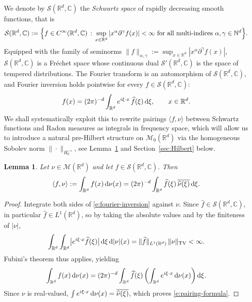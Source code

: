 \documentclass[12pt,a4paper,oneside]{amsart}
\theoremstyle{plain}
\newtheorem{lemma}[theorem]{Lemma}
\theoremstyle{definition}
\numberwithin{equation}{section}
\numberwithin{figure}{section}
\numberwithin{table}{section}
\theoremstyle{remark}
\newcommand{\R}{\mathbb{R}}
\newcommand{\dd}{\textup{d}}
\newcommand{\calM}{\mathcal{M}}
\newcommand{\N}{\mathbb{N}}
\newcommand{\Fhat}[1]{\widehat{#1}}
\begin{document}
We denote by $\mathcal{S}(\R^d,\mathbb{C})$ the \emph{Schwartz space} of
rapidly decreasing smooth functions, that is
\begin{equation*}
    \mathcal{S}(\R^d,\mathbb{C}) := \Bigl\{ f \in C^\infty(\R^d,\mathbb{C})
    \,:\, \sup_{x\in\R^d} |x^\alpha \partial^\gamma f(x)| < \infty
    \text{ for all multi-indices } \alpha, \gamma \in \N^d \Bigr\}.
\end{equation*}
Equipped with the family of seminorms $\|f\|_{\alpha,\gamma} :=
\sup_{x\in\R^d} |x^\alpha \partial^\gamma f(x)|$,
$\mathcal{S}(\R^d,\mathbb{C})$ is a Fr\'echet space whose continuous dual
$\mathcal{S}'(\R^d,\mathbb{C})$ is the space of tempered distributions.
The Fourier transform is an automorphism of $\mathcal{S}(\R^d,\mathbb{C})$,
and Fourier inversion holds pointwise for every
$f \in \mathcal{S}(\R^d,\mathbb{C})$:
\begin{equation}\label{e:fourier-inversion}
    f(x) = (2\pi)^{-d}\int_{\R^d} e^{i\xi \cdot x}\, \Fhat{f}(\xi)\,\dd\xi,
    \qquad x \in \R^d.
\end{equation}
We shall systematically exploit this
to rewrite pairings $\langle f, \nu \rangle$ between Schwartz functions and
Radon measures as integrals in frequency space, which will allow us to
introduce a natural pre-Hilbert structure on $\calM_0(\R^d)$ via the
homogeneous Sobolev norm $\|\cdot\|_{H^{-s}_0}$,
see Lemma~\ref{l:pairing-formula} and Section~\ref{sec:Hilbert} below.

\begin{lemma}\label{l:pairing-formula}
Let $\nu\in\calM(\R^d)$ and let $f\in\mathcal{S}(\R^d,\mathbb{C})$.
Then
\begin{equation}\label{e:pairing-formula}
\langle f,\nu \rangle:=\int_{\R^d} f(x)\,\dd\nu(x)
=(2\pi)^{-d}\int_{\R^d}\Fhat{f}(\xi)\,\overline{\Fhat{\nu}(\xi)}\,\dd\xi.
\end{equation}
\end{lemma}
\begin{proof}
Integrate both sides of \eqref{e:fourier-inversion} against $\nu$.
Since $\Fhat{f}\in \mathcal{S}(\R^d,\mathbb{C})$, in particular
$\Fhat{f} \in L^1(\R^d)$, so by taking the absolute values and by the finiteness
of $|\nu|$,
\[
\int_{\R^d}\int_{\R^d}\bigl|e^{i\xi\cdot x}\Fhat{f}(\xi)\bigr|\,\dd\xi\,\dd|\nu|(x)
=\|\Fhat{f}\|_{L^1(\R^d)}\,\|\nu\|_{\mathrm{TV}}<\infty.
\]
Fubini's theorem thus applies, yielding
\[
\int_{\R^d} f(x)\,\dd\nu(x)
=(2\pi)^{-d}\int_{\R^d}\Fhat{f}(\xi)
\left(\int_{\R^d}e^{i\xi\cdot x}\,\dd\nu(x)\right)\dd\xi.
\]
Since $\nu$ is real-valued,
$\int e^{i\xi\cdot x}\,\dd\nu(x) = \overline{\Fhat{\nu}(\xi)}$,
which proves \eqref{e:pairing-formula}.
\end{proof}
\end{document}
